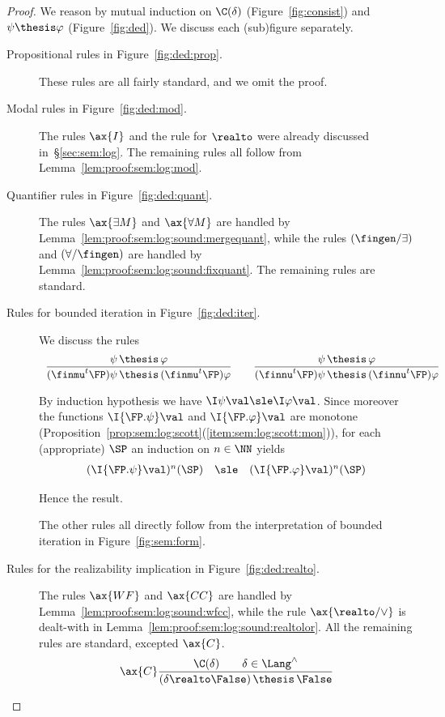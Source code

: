 \begin{proof}
We reason by mutual induction on $\C(\delta)$ (Figure~\ref{fig:consist})
and $\psi \thesis \varphi$ (Figure~\ref{fig:ded}).
We discuss each (sub)figure separately.
\begin{description}
\item[Propositional rules in Figure~\ref{fig:ded:prop}.]
These rules are all fairly standard, and we omit the proof.

\item[Modal rules in Figure~\ref{fig:ded:mod}.]
The rules $\ax{I}$ and the rule for $\realto$ were already
discussed in~\S\ref{sec:sem:log}.
The remaining rules all follow from Lemma~\ref{lem:proof:sem:log:mod}.

\item[Quantifier rules in Figure~\ref{fig:ded:quant}.]
The rules $\ax{\exists M}$ and $\ax{\forall M}$
are handled by Lemma~\ref{lem:proof:sem:log:sound:mergequant},
while the rules $(\fingen / \exists)$ and $(\forall / \fingen)$
are handled by Lemma~\ref{lem:proof:sem:log:sound:fixquant}.
The remaining rules are standard.

\item[Rules for bounded iteration in Figure~\ref{fig:ded:iter}.]
We discuss the rules
\[
\begin{array}{l l l}
%
\dfrac{\psi \,\thesis\, \varphi}
  {(\finmu^t \FP)\psi \,\thesis\, (\finmu^t \FP)\varphi}
%
\qquad
%
\dfrac{\psi \,\thesis\, \varphi}
  {(\finnu^t \FP)\psi \,\thesis\, (\finnu^t \FP)\varphi}
%
\end{array}
\]

\noindent
By induction hypothesis we have
$\I\psi\val \sle \I\varphi\val$.
Since moreover the functions
$\I{\FP.\psi}\val$ and $\I{\FP.\varphi}\val$
are monotone
(Proposition~\ref{prop:sem:log:scott}(\ref{item:sem:log:scott:mon})),
for each (appropriate) $\SP$ an induction on $n \in \NN$ yields
\[
\begin{array}{l l l}
  (\I{\FP.\psi}\val)^n(\SP)
& \sle
& (\I{\FP.\varphi}\val)^n(\SP)
\end{array}
\]

\noindent
Hence the result.

The other rules all directly follow from the interpretation
of bounded iteration in Figure~\ref{fig:sem:form}.

\item[Rules for the realizability implication in Figure~\ref{fig:ded:realto}.]
The rules $\ax{WF}$ and $\ax{CC}$ are handled by
Lemma~\ref{lem:proof:sem:log:sound:wfcc},
while the rule $\ax{{\realto}/\lor}$ is dealt-with
in Lemma~\ref{lem:proof:sem:log:sound:realtolor}.
%
All the remaining rules are standard, excepted $\ax{C}$.
\[
\ax{C}
\dfrac{\C(\delta)
  \qquad
  \delta \in \Lang^\land}
  {(\delta \realto \False) \,\thesis\, \False}
\]


\end{description}
\end{proof}
